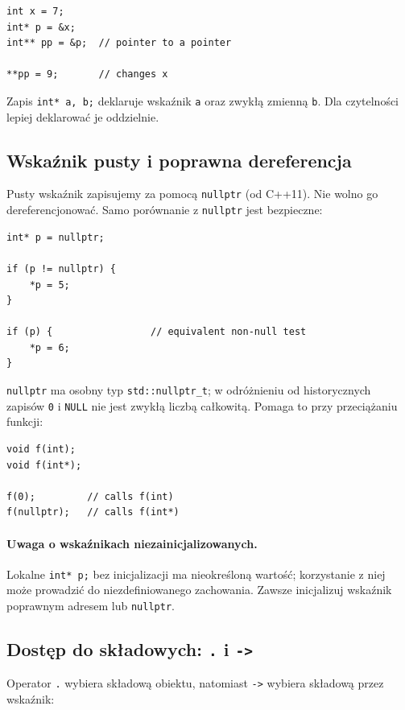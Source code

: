 \begin{lstlisting}
int x = 7;
int* p = &x;
int** pp = &p;  // pointer to a pointer

**pp = 9;       // changes x
\end{lstlisting}

Zapis \texttt{int* a, b;} deklaruje wskaźnik \texttt{a} oraz
zwykłą zmienną \texttt{b}. Dla czytelności lepiej deklarować je
oddzielnie.

\subsection{Wskaźnik pusty i poprawna dereferencja}

Pusty wskaźnik zapisujemy za pomocą \texttt{nullptr} (od C++11).
Nie wolno go dereferencjonować. Samo porównanie z
\texttt{nullptr} jest bezpieczne:

\begin{lstlisting}
int* p = nullptr;

if (p != nullptr) {
    *p = 5;
}

if (p) {                 // equivalent non-null test
    *p = 6;
}
\end{lstlisting}

\texttt{nullptr} ma osobny typ \texttt{std::nullptr\_t}; w odróżnieniu od
historycznych zapisów \texttt{0} i \texttt{NULL} nie jest zwykłą
liczbą całkowitą. Pomaga to przy przeciążaniu funkcji:

\begin{lstlisting}
void f(int);
void f(int*);

f(0);         // calls f(int)
f(nullptr);   // calls f(int*)
\end{lstlisting}

\paragraph{Uwaga o wskaźnikach niezainicjalizowanych.}
Lokalne \texttt{int* p;} bez inicjalizacji ma nieokreśloną wartość;
korzystanie z niej może prowadzić do niezdefiniowanego zachowania.
Zawsze inicjalizuj wskaźnik poprawnym adresem lub \texttt{nullptr}.

\subsection{Dostęp do składowych: \texttt{.} i \texttt{->}}

Operator \texttt{.} wybiera składową obiektu, natomiast
\texttt{->} wybiera składową przez wskaźnik:

